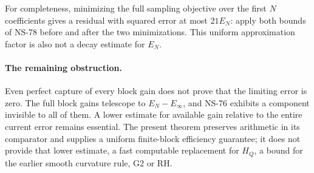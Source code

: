 For completeness, minimizing the full sampling objective over the first
$N$ coefficients gives a residual with squared error at most $21E_N$:
apply both bounds of NS-78 before and after the two minimizations.
This uniform approximation factor is also not a decay estimate for $E_N$.

\paragraph{The remaining obstruction.}
Even perfect capture of every block gain does not prove that the limiting
error is zero. The full block gains telescope to $E_N-E_\infty$, and
NS-76 exhibits a component invisible to all of them. A lower estimate
for available gain relative to the entire current error remains essential.
The present theorem preserves arithmetic in its comparator and supplies a
uniform finite-block efficiency guarantee; it does not provide that lower
estimate, a fast computable replacement for $H_Q$, a bound for the earlier
smooth curvature rule, G2 or RH.
